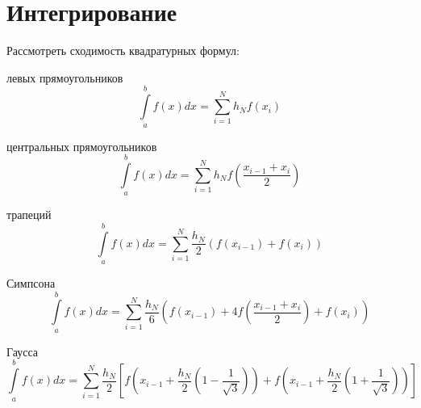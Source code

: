 \section{Интегрирование}

Рассмотреть сходимость квадратурных формул:

левых прямоугольников
$$
	\int\limits_a^b f(x) dx = \sum\limits_{i=1}^N h_N f(x_i)
$$

центральных прямоугольников
$$
	\int\limits_a^b f(x) dx = \sum\limits_{i=1}^N h_N f(\frac{x_{i-1} + x_i}{2})
$$

трапеций
$$
	\int\limits_a^b f(x) dx = \sum\limits_{i=1}^N \frac{h_N}{2} \left( f(x_{i-1}) + f(x_i) \right)
$$

Симпсона
$$
	\int\limits_a^b f(x) dx = \sum\limits_{i=1}^N \frac{h_N}{6} \left( f(x_{i-1}) + 4f(\frac{x_{i-1} + x_i}{2}) + f(x_i) \right)
$$

Гаусса
$$
	\int\limits_a^b f(x) dx = \sum\limits_{i=1}^N \frac{h_N}{2} \left[ f\left( x_{i-1} + \frac{h_N}{2}\left( 1 - \frac{1}{\sqrt{3}} \right)\right) +  f\left( x_{i-1} + \frac{h_N}{2}\left( 1 + \frac{1}{\sqrt{3}} \right)\right) \right]
$$
